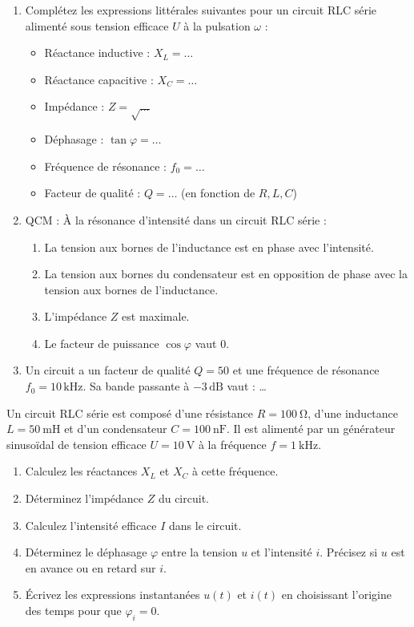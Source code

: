 \documentclass[11pt]{article}
\begin{document}
\begin{exercice}
\begin{enumerate}
    \item Complétez les expressions littérales suivantes pour un circuit RLC série alimenté sous tension efficace $U$ à la pulsation $\omega$ :
    \begin{itemize}
        \item Réactance inductive : $X_L = \dots$
        \item Réactance capacitive : $X_C = \dots$
        \item Impédance : $Z = \sqrt{\dots}$
        \item Déphasage : $\tan\varphi = \dots$
        \item Fréquence de résonance : $f_0 = \dots$
        \item Facteur de qualité : $Q = \dots$ (en fonction de $R, L, C$)
    \end{itemize}
    \item QCM : À la résonance d'intensité dans un circuit RLC série :
    \begin{enumerate}
        \item La tension aux bornes de l'inductance est en phase avec l'intensité.
        \item La tension aux bornes du condensateur est en opposition de phase avec la tension aux bornes de l'inductance.
        \item L'impédance $Z$ est maximale.
        \item Le facteur de puissance $\cos\varphi$ vaut $0$.
    \end{enumerate}
    \item Un circuit a un facteur de qualité $Q = 50$ et une fréquence de résonance $f_0 = 10\,\text{kHz}$. Sa bande passante à $-3\,\text{dB}$ vaut : \dots
\end{enumerate}
\end{exercice}

\begin{exercice}
Un circuit RLC série est composé d'une résistance $R = \SI{100}{\ohm}$, d'une inductance $L = \SI{50}{\milli\henry}$ et d'un condensateur $C = \SI{100}{\nano\farad}$. Il est alimenté par un générateur sinusoïdal de tension efficace $U = \SI{10}{\volt}$ à la fréquence $f = \SI{1}{\kilo\hertz}$.
\begin{enumerate}
    \item Calculez les réactances $X_L$ et $X_C$ à cette fréquence.
    \item Déterminez l'impédance $Z$ du circuit.
    \item Calculez l'intensité efficace $I$ dans le circuit.
    \item Déterminez le déphasage $\varphi$ entre la tension $u$ et l'intensité $i$. Précisez si $u$ est en avance ou en retard sur $i$.
    \item Écrivez les expressions instantanées $u(t)$ et $i(t)$ en choisissant l'origine des temps pour que $\varphi_i = 0$.
\end{enumerate}
\end{exercice}
\end{document}
